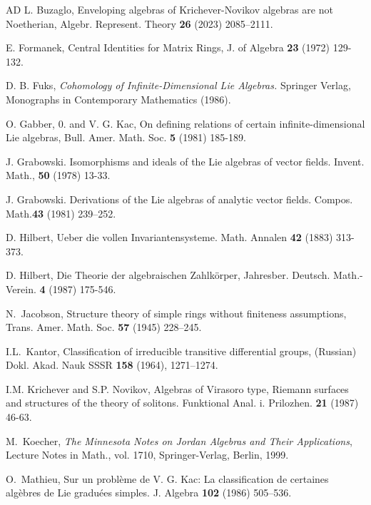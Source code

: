 \documentclass[11pt, letterpaper, reqno]{amsart}
\theoremstyle{definition}
\begin{document}
\begin{thebibliography}{AD}
 L. Buzaglo, Enveloping algebras of Krichever-Novikov algebras are not Noetherian, 
Algebr. Represent. Theory \textbf{26}  (2023)  2085--2111. 



 E. Formanek, Central Identities for Matrix Rings, J. of Algebra 
\textbf{23} (1972) 129-132.


 D. B. Fuks,
{\it Cohomology of Infinite-Dimensional Lie Algebras.}
Springer Verlag, Monographs in Contemporary Mathematics (1986).

 O. Gabber, 0. and  V. G.  Kac, On defining relations of certain infinite-dimensional Lie algebras, Bull. Amer. Math. Soc. {\bf 5} (1981) 185-189.

J. Grabowski. Isomorphisms and ideals of the Lie algebras of vector fields. Invent.
Math., \textbf{50} (1978) 13-33.

J. Grabowski. Derivations of the Lie algebras of analytic vector fields. Compos.
Math.\textbf{43} (1981) 239–252.

 D. Hilbert, Ueber die vollen Invariantensysteme. Math. Annalen {\bf 42} (1883) 313-373.

 D. Hilbert, Die Theorie der algebraischen Zahlkörper, Jahresber. Deutsch. Math.-Verein. {\bf 4}
(1987) 175-546.

 N.~Jacobson, Structure theory of simple rings without finiteness assumptions, Trans. Amer. Math.
Soc. {\bf 57} (1945) 228–245.


 I.L.~Kantor, Classification of irreducible transitive differential groups, (Russian) Dokl. Akad. Nauk SSSR {\bf 158} 
(1964), 1271--1274.

 I.M. Krichever and S.P. Novikov, Algebras of Virasoro type, Riemann surfaces and structures of
the theory of solitons. Funktional Anal. i. Prilozhen. 
{\bf 21} (1987) 46-63.

M.~Koecher, {\it The Minnesota Notes on Jordan Algebras and Their Applications},  Lecture Notes in Math., vol. 1710, Springer-Verlag, Berlin,  1999.


 O.~Mathieu, 
Sur un problème de V. G. Kac: La classification de certaines algèbres de Lie graduées simples.
J. Algebra \textbf{102} (1986) 505--536.


\end{thebibliography}
\end{document}
